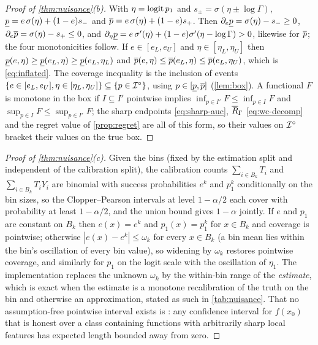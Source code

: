 \begin{proof}[Proof of \cref{thm:nuisance}(b)]
With $\eta=\operatorname{logit} p_1$ and $s_\pm=\sigma(\eta\pm\log\Gamma)$,
$\underline{p}=e\,\sigma(\eta)+(1-e)s_-$ and $\overline{p}=e\,\sigma(\eta)+(1-e)s_+$. Then
$\partial_e\underline{p}=\sigma(\eta)-s_-\ge0$, $\partial_e\overline{p}=\sigma(\eta)-s_+\le0$,
and $\partial_\eta\underline{p}=e\,\sigma'(\eta)+(1-e)\sigma'(\eta-\log\Gamma)>0$,
likewise for $\overline{p}$; the four monotonicities follow. If $e\in[e_L,e_U]$ and
$\eta\in[\eta_L,\eta_U]$ then
$\underline{p}(e,\eta)\ge\underline{p}(e_L,\eta)\ge\underline{p}(e_L,\eta_L)$ and
$\overline{p}(e,\eta)\le\overline{p}(e_L,\eta)\le\overline{p}(e_L,\eta_U)$, which is
\eqref{eq:inflated}. The coverage inequality is the inclusion of events
$\{e\in[e_L,e_U],\eta\in[\eta_L,\eta_U]\}\subseteq\{p\in\mathcal{I}^\circ\}$, using
$p\in[\underline{p},\overline{p}]$ (\cref{lem:box}). A functional $F$ is monotone in the box
if $I\subseteq I'$ pointwise implies $\inf_{p\in I'}F\le\inf_{p\in I}F$ and
$\sup_{p\in I}F\le\sup_{p\in I'}F$; the sharp endpoints
\eqref{eq:sharp-auc}, $\overline{R}_\Gamma$ \eqref{eq:wc-decomp} and the regret
value of \cref{prop:regret} are all of this form, so their values on $\mathcal{I}^\circ$
bracket their values on the true box.
\end{proof}

\begin{proof}[Proof of \cref{thm:nuisance}(c)]
Given the bins (fixed by the estimation split and independent of the
calibration split), the calibration counts $\sum_{i\in B_k}T_i$ and
$\sum_{i\in B_k}T_iY_i$ are binomial with success probabilities $e^k$ and
$p_1^k$ conditionally on the bin sizes, so the Clopper--Pearson intervals at
level $1-\alpha/2$ each cover with probability at least $1-\alpha/2$, and the
union bound gives $1-\alpha$ jointly. If $e$ and $p_1$ are constant on $B_k$
then $e(x)=e^k$ and $p_1(x)=p_1^k$ for $x\in B_k$ and coverage is pointwise;
otherwise $|e(x)-e^k|\le\omega_k$ for every $x\in B_k$ (a bin mean lies within
the bin's oscillation of every bin value), so widening by $\omega_k$ restores
pointwise coverage, and similarly for $p_1$ on the logit scale with the
oscillation of $\eta_1$. The implementation replaces the unknown $\omega_k$
by the within-bin range of the \emph{estimate}, which is exact when the
estimate is a monotone recalibration of the truth on the bin and otherwise an
approximation, stated as such in \cref{tab:nuisance}. That no assumption-free
pointwise interval exists is \citet{low1997nonparametric}: any confidence
interval for $f(x_0)$ that is honest over a class containing functions with
arbitrarily sharp local features has expected length bounded away from zero.
\end{proof}

